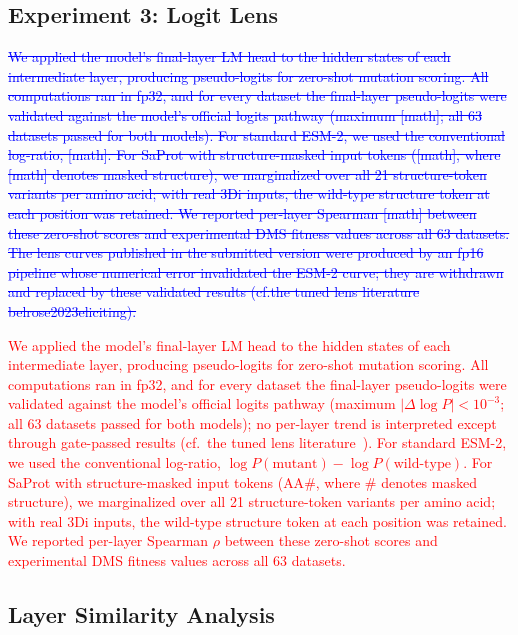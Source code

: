\documentclass[11pt,a4paper]{article}
\newcommand{\rev}[1]{\textcolor{red}{#1}}
\begin{document}
\subsection{Experiment 3: Logit Lens}

\textcolor{blue}{\sout{We applied the model's final-layer LM head to the hidden states of each
intermediate layer, producing pseudo-logits for zero-shot mutation scoring. All
computations ran in fp32, and for every dataset the final-layer pseudo-logits were
validated against the model's official logits pathway (maximum [math]; all 63 datasets passed for both models). For standard ESM-2, we used the
conventional log-ratio, [math]. For SaProt
with structure-masked input tokens ([math], where [math] denotes masked
structure), we marginalized over all 21 structure-token variants per amino acid; with
real 3Di inputs, the wild-type structure token at each position was retained. We
reported per-layer Spearman [math] between these zero-shot scores and experimental
DMS fitness values across all 63 datasets. The lens curves published in the submitted
version were produced by an fp16 pipeline whose numerical error invalidated the ESM-2
curve; they are withdrawn and replaced by these validated results
(cf.the tuned lens literature belrose2023eliciting).}}

\textcolor{red}{\rev{We applied the model's final-layer LM head to the hidden states of each
intermediate layer, producing pseudo-logits for zero-shot mutation scoring. All
computations ran in fp32, and for every dataset the final-layer pseudo-logits were
validated against the model's official logits pathway (maximum $|\Delta \log P| <
10^{-3}$; all 63 datasets passed for both models); no per-layer trend is
interpreted except through gate-passed results
(cf.\ the tuned lens literature~\cite{belrose2023eliciting}). For standard ESM-2, we
used the conventional log-ratio, $\log P(\text{mutant}) - \log P(\text{wild-type})$.
For SaProt with structure-masked input tokens ($\text{AA}\#$, where $\#$ denotes
masked structure), we marginalized over all 21 structure-token variants per amino
acid; with real 3Di inputs, the wild-type structure token at each position was
retained. We reported per-layer Spearman $\rho$ between these zero-shot scores and
experimental DMS fitness values across all 63 datasets.}}

\subsection{Layer Similarity Analysis}
\end{document}
